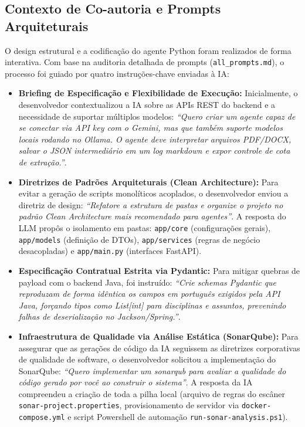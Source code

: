 \documentclass[sigconf]{acmart}
\begin{document}
\subsection{Contexto de Co-autoria e Prompts Arquiteturais}
O design estrutural e a codificação do agente Python foram realizados de forma interativa. Com base na auditoria detalhada de prompts (\lstinline{all_prompts.md}), o processo foi guiado por quatro instruções-chave enviadas à IA:
\begin{itemize}
\item \textbf{Briefing de Especificação e Flexibilidade de Execução:} Inicialmente, o desenvolvedor contextualizou a IA sobre as APIs REST do backend e a necessidade de suportar múltiplos modelos: \textit{``Quero criar um agente capaz de se conectar via API key com o Gemini, mas que também suporte modelos locais rodando no Ollama. O agente deve interpretar arquivos PDF/DOCX, salvar o JSON intermediário em um log markdown e expor controle de cota de extração.''}.
\item \textbf{Diretrizes de Padrões Arquiteturais (Clean Architecture):} Para evitar a geração de scripts monolíticos acoplados, o desenvolvedor enviou a diretriz de design: \textit{``Refatore a estrutura de pastas e organize o projeto no padrão Clean Architecture mais recomendado para agentes''}. A resposta do LLM propôs o isolamento em pastas: \lstinline{app/core} (configurações gerais), \lstinline{app/models} (definição de DTOs), \lstinline{app/services} (regras de negócio desacopladas) e \lstinline{app/main.py} (interfaces FastAPI).
\item \textbf{Especificação Contratual Estrita via Pydantic:} Para mitigar quebras de payload com o backend Java, foi instruído: \textit{``Crie schemas Pydantic que reproduzam de forma idêntica os campos em português exigidos pela API Java, forçando tipos como List[int] para disciplinas e assuntos, prevenindo falhas de deserialização no Jackson/Spring.''}.
\item \textbf{Infraestrutura de Qualidade via Análise Estática (SonarQube):} Para assegurar que as gerações de código da IA seguissem as diretrizes corporativas de qualidade de software, o desenvolvedor solicitou a implementação do SonarQube: \textit{``Quero implementar um sonarqub para avaliar a qualidade do código gerado por você ao construir o sistema''}. A resposta da IA compreendeu a criação de toda a pilha local (arquivo de regras do escâner \lstinline{sonar-project.properties}, provisionamento de servidor via \lstinline{docker-compose.yml} e script Powershell de automação \lstinline{run-sonar-analysis.ps1}).
\end{itemize}
\end{document}
